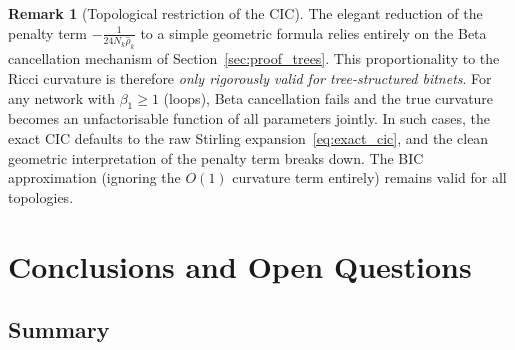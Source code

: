 \documentclass[11pt]{article}
\theoremstyle{definition}
\newtheorem{remark}[theorem]{Remark}
\begin{document}
\begin{remark}[Topological restriction of the CIC]\label{rem:cic_scope}
The elegant reduction of the penalty term $-\frac{1}{24N_k\hat\rho_k}$ 
to a simple geometric formula relies entirely on the Beta cancellation 
mechanism of Section~\ref{sec:proof_trees}.  This proportionality to 
the Ricci curvature is therefore \emph{only rigorously valid for 
tree-structured bitnets}.  For any network with $\beta_1 \geq 1$ 
(loops), Beta cancellation fails and the true curvature becomes an 
unfactorisable function of all parameters jointly.  In such cases, 
the exact CIC defaults to the raw Stirling expansion~\eqref{eq:exact_cic}, 
and the clean geometric interpretation of the penalty term breaks down.  
The BIC approximation (ignoring the $O(1)$ curvature term entirely) 
remains valid for all topologies.
\end{remark}

\section{Conclusions and Open Questions}\label{sec:conclusion}

\subsection{Summary}
\end{document}
